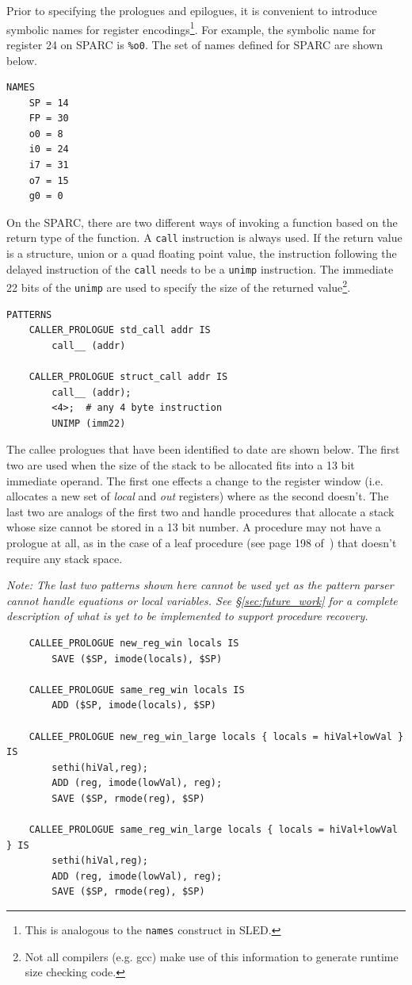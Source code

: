 Prior to specifying the prologues and epilogues, it is convenient
to introduce symbolic names for register encodings\footnote{This
is analogous to the {\tt names} construct in SLED.}. For example,
the symbolic name for register 24 on SPARC is {\tt \%o0}. The
set of names defined for SPARC are shown below.

\begin{verbatim}
NAMES
    SP = 14
    FP = 30
    o0 = 8
    i0 = 24
    i7 = 31
    o7 = 15
    g0 = 0
\end{verbatim}

On the SPARC, there are two different ways of invoking a function
based on the return type of the function.  A \texttt{call}
instruction is always used. If the return value is a structure,
union or a quad floating point value, the instruction following the
delayed instruction of the \texttt{call} needs to be a \texttt{unimp}
instruction.  The immediate 22 bits of the \texttt{unimp} are used
to specify the size of the returned value\footnote{Not all compilers
(e.g. gcc) make use of this information to generate runtime size
checking code.}.

\begin{verbatim}
PATTERNS
    CALLER_PROLOGUE std_call addr IS
        call__ (addr)

    CALLER_PROLOGUE struct_call addr IS
        call__ (addr); 
        <4>;  # any 4 byte instruction
        UNIMP (imm22)
\end{verbatim}

The callee prologues that have been identified to date are shown
below. The first two are used when the size of the stack to be
allocated fits into a 13 bit immediate operand. The first one effects
a change to the register window (i.e. allocates a new set of {\it
local} and {\it out} registers) where as the second doesn't. The last
two are analogs of the first two and handle procedures that allocate
a stack whose size cannot be stored in a 13 bit number. A procedure
may not have a prologue at all, as in the case of a leaf procedure
(see page 198 of~\cite{Sparc8}) that doesn't require any stack space.

{\it Note: The last two patterns shown here cannot be used yet as
the pattern parser cannot handle equations or local variables. See
\S\ref{sec:future_work} for a complete description of what is yet
to be implemented to support procedure recovery.}

\begin{verbatim}
    CALLEE_PROLOGUE new_reg_win locals IS
        SAVE ($SP, imode(locals), $SP)

    CALLEE_PROLOGUE same_reg_win locals IS
        ADD ($SP, imode(locals), $SP)

    CALLEE_PROLOGUE new_reg_win_large locals { locals = hiVal+lowVal } IS
        sethi(hiVal,reg);
        ADD (reg, imode(lowVal), reg);
        SAVE ($SP, rmode(reg), $SP)

    CALLEE_PROLOGUE same_reg_win_large locals { locals = hiVal+lowVal } IS
        sethi(hiVal,reg);
        ADD (reg, imode(lowVal), reg);
        SAVE ($SP, rmode(reg), $SP)
\end{verbatim}

